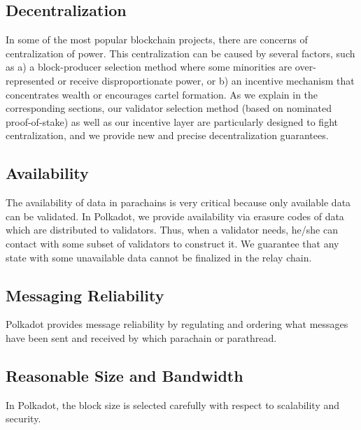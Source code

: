 \subsection{Decentralization}

In some of the most popular blockchain projects, there are concerns of centralization of power.
This centralization can be caused by several factors, such as
a) a block-producer selection method where some minorities are over-represented or receive disproportionate power, or
b) an incentive mechanism that concentrates wealth or encourages cartel formation.
As we explain in the corresponding sections, our validator selection method (based on nominated proof-of-stake)
as well as our incentive layer are particularly designed to fight centralization,
and we provide new and precise decentralization guarantees.


 \subsection{Availability}
The availability of data in parachains is very critical because only available data can be validated.  In Polkadot, we provide availability via erasure codes of data which are distributed to validators. Thus, when a validator needs, he/she can contact with some subset of validators to construct it. We guarantee that any state with some unavailable data cannot be finalized in the relay chain.



\subsection{Messaging Reliability} Polkadot provides message reliability by regulating and ordering what messages have been sent and received by which parachain or parathread.

\subsection{Reasonable Size and Bandwidth} In Polkadot, the block size is selected carefully with respect to scalability and security.


